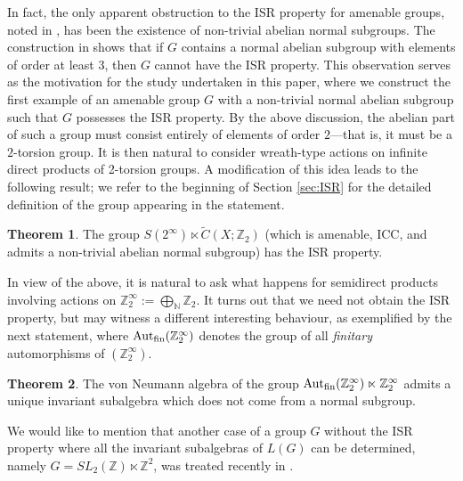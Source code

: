 \documentclass[11pt]{amsart}
\newcommand{\N}{\mathbb N}
\newcommand{\Z}{\mathbb Z}
\newcommand{\Aut}{\textup{Aut}}
\theoremstyle{plain}
\theoremstyle{definition}
\newtheorem{thmx}{Theorem}
\theoremstyle{remark}
\numberwithin{equation}{section}
\begin{document}
In fact, the only apparent obstruction to the ISR property for amenable groups, noted in \cite[Example~3.5]{amrutam2023invariant}, has been the existence of non-trivial abelian normal subgroups. The construction in \cite[Example~3.5]{amrutam2023invariant} shows that if \( G \) contains a normal abelian subgroup with elements of order at least 3, then \( G \) cannot have the ISR property. This observation serves as the motivation for the study undertaken in this paper, where we construct the first example of an amenable group \( G \) with a non-trivial normal abelian subgroup such that \( G \) possesses the ISR property. By the above discussion, the abelian part of such a group must consist entirely of elements of order $2$—that is, it must be a $2$-torsion group. It is then natural to consider wreath-type actions on infinite direct products of 2-torsion groups. A modification of this idea leads to the following result; we refer to the beginning of Section \ref{sec:ISR} for the detailed definition of the group appearing in the statement.



\begin{thmx} \label{thm:A}
 The group $S(2^\infty) \ltimes \tilde{C}(X; \mathbb Z_2)$ (which is amenable, ICC, and admits a non-trivial abelian normal subgroup) has the ISR property.
	\end{thmx}

In view of the above, it is natural to ask what happens for semidirect products involving actions on $\Z_2^\infty:= \bigoplus_{\N} \Z_2$. It turns out that we need not obtain the ISR property, but may witness a different interesting behaviour, as exemplified by the next statement, where $\Aut_{\textup{fin}}(\Z_2^\infty)$ denotes the group of all \emph{finitary} automorphisms of $(\Z_2^\infty)$.

\begin{thmx} \label{thm:B}
	The von Neumann algebra of the group $\Aut_{\textup{fin}}(\Z_2^\infty) \ltimes \Z_2^\infty$  admits a unique invariant subalgebra which does not come from a normal subgroup.
\end{thmx}
We would like to mention that another case of a group $G$ without the ISR property where all the invariant subalgebras of $L(G)$ can be determined, namely $G=SL_2(\Z) \ltimes \Z^2$, was treated recently in \cite{JiangLiu}.
\end{document}
